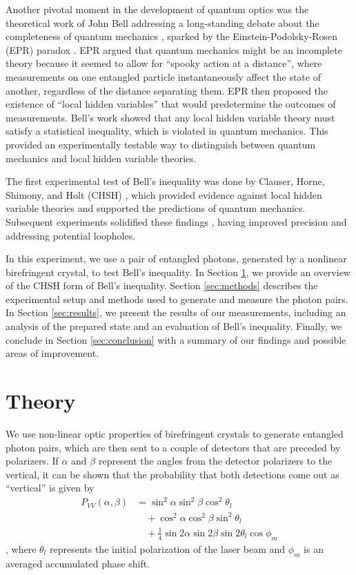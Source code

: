 \documentclass{../paper}
\begin{document}
Another pivotal moment in the development of quantum optics was the theoretical work of John Bell addressing a long-standing debate about the completeness of quantum mechanics \cite{Bell1964}, sparked by the Einstein-Podolsky-Rosen (EPR) paradox \cite{Einstein1935}. EPR argued that quantum mechanics might be an incomplete theory because it seemed to allow for ``spooky action at a distance'', where measurements on one entangled particle instantaneously affect the state of another, regardless of the distance separating them. EPR then proposed the existence of ``local hidden variables'' that would predetermine the outcomes of measurements. Bell's work showed that any local hidden variable theory must satisfy a statistical inequality, which is violated in quantum mechanics. This provided an experimentally testable way to distinguish between quantum mechanics and local hidden variable theories.

The first experimental test of Bell's inequality was done by Clauser, Horne, Shimony, and Holt (CHSH) \cite{Clauser1969}, which provided evidence against local hidden variable theories and supported the predictions of quantum mechanics. Subsequent experiments solidified these findings \cite{Aspect1982, Weihs1998}, having improved precision and addressing potential loopholes.

In this experiment, we use a pair of entangled photons, generated by a nonlinear birefringent crystal, to test Bell's inequality. In Section \ref{sec:theory}, we provide an overview of the CHSH form of Bell's inequality. Section \ref{sec:methods} describes the experimental setup and methods used to generate and measure the photon pairs. In Section \ref{sec:results}, we present the results of our measurements, including an analysis of the prepared state and an evaluation of Bell's inequality. Finally, we conclude in Section \ref{sec:conclusion} with a summary of our findings and possible areas of improvement.

\section{Theory}\label{sec:theory}

We use non-linear optic properties of birefringent crystals to generate entangled photon pairs, which are then sent to a couple of detectors that are preceded by polarizers. If $\alpha$ and $\beta$ represent the angles from the detector polarizers to the vertical, it can be shown that the probability that both detections come out as ``vertical'' is given by
\begin{equation}\label{eq:Pvv}
  \begin{aligned}
    P_{VV}(\alpha, \beta)
    &= \sin^2\alpha \sin^2\beta \cos^2\theta_l \\
    &\quad + \cos^2\alpha \cos^2\beta \sin^2\theta_l \\
    &\quad + \frac{1}{4} \sin2\alpha \sin2\beta \sin2\theta_l \cos\phi_m
  \end{aligned}
\end{equation}
\cite{Dehlinger2002}, where $\theta_l$ represents the initial polarization of the laser beam and $\phi_m$ is an averaged accumulated phase shift.
\end{document}
